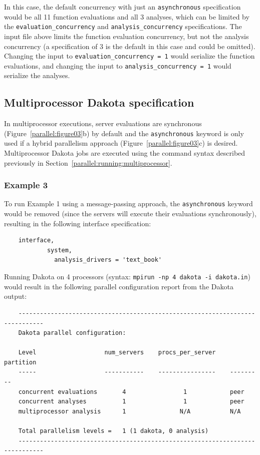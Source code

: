 In this case, the default concurrency with just an
\texttt{asynchronous} specification would be all 11 function
evaluations and all 3 analyses, which can be limited by the
\texttt{evaluation\_concurrency} and \texttt{analysis\_concurrency}
specifications. The input file above limits the function evaluation
concurrency, but not the analysis concurrency (a specification of 3 is
the default in this case and could be omitted). Changing the input to
\texttt{evaluation\_concurrency = 1} would serialize the function
evaluations, and changing the input to \texttt{analysis\_concurrency = 1}
would serialize the analyses.

\subsection{Multiprocessor Dakota specification}\label{parallel:spec:multi}

In multiprocessor executions, server evaluations are synchronous
(Figure~\ref{parallel:figure03}b) by default and the
\texttt{asynchronous} keyword is only used if a hybrid parallelism
approach (Figure~\ref{parallel:figure03}c) is desired. Multiprocessor
Dakota jobs are executed using the command syntax described previously
in Section~\ref{parallel:running:multiprocessor}.

\subsubsection{Example 3}\label{parallel:spec:multi:example3}

To run Example 1 using a message-passing approach, the
\texttt{asynchronous} keyword would be removed (since the servers will
execute their evaluations synchronously), resulting in the following
interface specification:
\begin{small}
\begin{verbatim}
    interface,
            system,
              analysis_drivers = 'text_book'
\end{verbatim}
\end{small}

Running Dakota on 4 processors (syntax: \texttt{mpirun -np 4 dakota -i
  dakota.in}) would result in the following parallel configuration
report from the Dakota output:
\begin{small}
\begin{verbatim}
    -----------------------------------------------------------------------------
    Dakota parallel configuration:

    Level                   num_servers    procs_per_server    partition
    -----                   -----------    ----------------    ---------
    concurrent evaluations       4                1            peer
    concurrent analyses          1                1            peer
    multiprocessor analysis      1               N/A           N/A

    Total parallelism levels =   1 (1 dakota, 0 analysis)
    -----------------------------------------------------------------------------
\end{verbatim}
\end{small}

